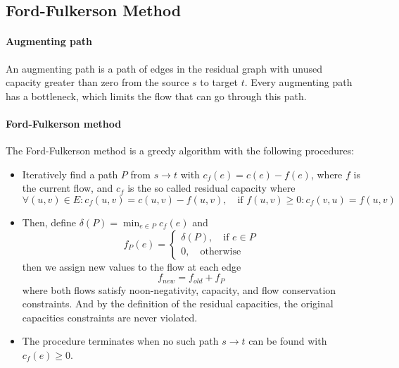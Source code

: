             \subsection{Ford-Fulkerson Method}

                \paragraph{Augmenting path}
                    An augmenting path is a path of edges in the residual graph with unused capacity greater than zero from the source $s$ to target $t$. Every augmenting path has a bottleneck, which limits the flow that can go through this path.

                \paragraph{Ford-Fulkerson method}
                    The Ford-Fulkerson method is a greedy algorithm with the following procedures:

                    \begin{itemize}
                        \item Iteratively find a path $P$ from $s \rightarrow t$ with $c_f(e) = c(e) - f(e)$, where $f$ is the current flow, and $c_f$ is the so called residual capacity where
                        \begin{equation}
                            \forall (u, v) \in E: c_f(u, v) = c(u, v) - f(u, v),\quad \text{if } f(u, v) \ge 0: c_f(v, u) = f(u, v)
                        \end{equation}
                        \item Then, define $\delta(P) = \min_{e \in P} c_f(e)$ and
                        \begin{equation}
                            f_P(e) = \begin{cases}
                                \delta(P), \quad \text{if } e\in P\\0, \quad \text{otherwise}
                            \end{cases}
                        \end{equation}
                        then we assign new values to the flow at each edge
                        \begin{equation}
                            f_{new} = f_{old} + f_P
                        \end{equation}
                        where both flows satisfy noon-negativity, capacity, and flow conservation constraints. And by the definition of the residual capacities, the original capacities constraints are never violated.
                        \item The procedure terminates when no such path $s \rightarrow t$ can be found with $c_f(e) \ge 0$.
                    \end{itemize}
                    
